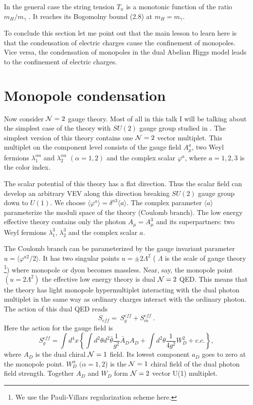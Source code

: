 \documentclass[a4paper,12pt]{article}
\begin{document}
In the general case the string tension $T_n$ is a monotonic 
function of the ratio $m_{H}/m_{\gamma}$ \cite{BV}. It reaches
its Bogomolny bound (2.8) at $m_H=m_\gamma$.

To conclude this section let me point out that the main lesson
to learn here is
 that the condensation of electric charges cause the
confinement of monopoles. Vice versa,  the condensation of
monopoles in the dual Abelian Higgs model leads to the
confinement of electric charges.

\section{Monopole condensation}
\setcounter{equation}{0}


Now consider ${\cal N}=2$ gauge theory. Most of all in this talk I will
be talking about the simplest case of the theory with
$SU(2)$ gauge group
studied in \cite{SW1}. The simplest version of this theory contains 
one 
  ${\cal N}=2$ vector multiplet.
This multiplet on the component level consists of  the
gauge field $A^a_\mu$, two Weyl fermions $\lambda^{\alpha a}_1$
and $\lambda^{\alpha a}_2$ $(\alpha=1,2)$ and the complex scalar
$\varphi^a$, where $a=1,2,3$ is the color index.

The scalar potential of this theory has a flat direction. Thus
the scalar field can develop an arbitrary VEV along this
direction breaking $SU(2)$ gauge group down to $U(1)$. We choose
$\langle\varphi^a\rangle=\delta^{a3}\langle a\rangle$. The
complex parameter $\langle a\rangle$ parameterize the moduli
space of the theory (Coulomb branch). The low energy effective
theory contains only the photon $A_\mu=A^3_\mu$ and its
superpartners: two Weyl fermions $\lambda^3_1$, $\lambda^3_2$
and the complex scalar $a$.

The Coulomb branch can be parameterized by the gauge invariant parameter
$u=\langle\varphi^{a2}/2\rangle$. It
 has two singular points $u=\pm2\Lambda^2$
( $\Lambda$ is the scale of
gauge theory \footnote{We use the Pauli-Villars regularization scheme
here.}) where monopole or dyon becomes massless. Near,
say, the monopole point $(u=2\Lambda^2)$ the effective low
energy theory is  dual ${\cal N}=2$ QED. This means that the theory
has light monopole hypermultiplet interacting with the dual
photon multiplet in the same way as ordinary charges interact
with the ordinary photon. The action of this dual QED reads
\begin{equation}
S_{eff}=\ S^{eff}_g+S^{eff}_m\ .
\end{equation}
Here the action for the gauge field is
\begin{equation}
S^{eff}_g=\int d^4x\left\{\int d^2\theta d^2\bar\theta \frac1{g^2}
\bar A_DA_D+\int d^2\theta\frac1{4g^2}W^2_D+c.c.\right\},
\end{equation}
where $A_D$ is the  dual chiral ${\cal N}=1$ field. Its lowest component
$a_D$ goes to zero at the monopole point. $W_D^\alpha$
$(\alpha=1,2$) is the ${\cal N}=1$ chiral field of the dual photon
field strength.  Together $A_D$ and $W_D$ form  ${\cal N}=2$ vector
U(1) multiplet.
\end{document}
